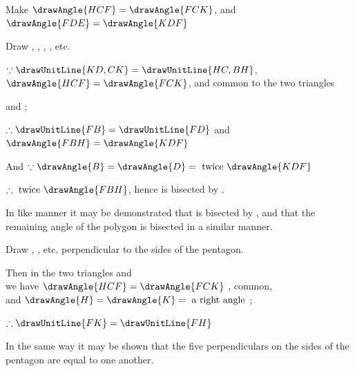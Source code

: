 \documentclass[booklanguage=english]{byrnebook}
\begin{document}
\begin{center}
Make $\drawAngle{HCF} = \drawAngle{FCK}$, and $\drawAngle{FDE} = \drawAngle{KDF}$ 

Draw , , , , etc.

$\because \drawUnitLine{KD,CK} = \drawUnitLine{HC,BH}$, $\drawAngle{HCF} = \drawAngle{FCK}$, and  common to the two triangles %

and
;

$\therefore \drawUnitLine{FB} = \drawUnitLine{FD}$ and $\drawAngle{FBH} = \drawAngle{KDF}$ 

And $\because \drawAngle{B} = \drawAngle{D} = \mbox{ twice } \drawAngle{KDF}$ %

$\therefore \mbox{ twice } \drawAngle{FBH}$, hence  is bisected by .

In like manner it may be demonstrated that  is bisected by , and that the remaining angle of the polygon is bisected in a similar manner.

Draw , , etc. perpendicular to the sides of the pentagon.

Then in the two triangles
and
\\
we have $\drawAngle{HCF} = \drawAngle{FCK}$ \byref{\constref},  common,\\
and $\drawAngle{H} = \drawAngle{K} = \mbox{ a right angle }$;

$\therefore \drawUnitLine{FK} = \drawUnitLine{FH}$ 
\end{center}

In the same way it may be shown that the five perpendiculars on the sides of the pentagon are equal to one another.
\end{document}
